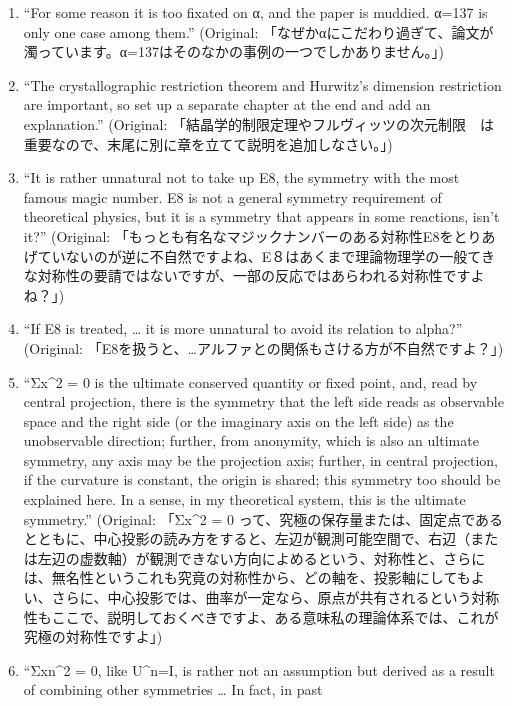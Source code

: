 \documentclass[
  a4paper,
]{article}
\providecommand{\tightlist}{%
  \setlength{\itemsep}{0pt}\setlength{\parskip}{0pt}}
\begin{document}
\begin{enumerate}
\def\labelenumi{\arabic{enumi}.}
\setcounter{enumi}{11}
\tightlist
\item
  ``For some reason it is too fixated on α, and the paper is muddied.
  α=137 is only one case among them.'' (Original:
  「なぜかαにこだわり過ぎて、論文が濁っています。α=137はそのなかの事例の一つでしかありません。」)
\item
  ``The crystallographic restriction theorem and Hurwitz's dimension
  restriction are important, so set up a separate chapter at the end and
  add an explanation.'' (Original:
  「結晶学的制限定理やフルヴィッツの次元制限　は重要なので、末尾に別に章を立てて説明を追加しなさい。」)
\item
  ``It is rather unnatural not to take up E8, the symmetry with the most
  famous magic number. E8 is not a general symmetry requirement of
  theoretical physics, but it is a symmetry that appears in some
  reactions, isn't it?'' (Original:
  「もっとも有名なマジックナンバーのある対称性E8をとりあげていないのが逆に不自然ですよね、E８はあくまで理論物理学の一般てきな対称性の要請ではないですが、一部の反応ではあらわれる対称性ですよね？」)
\item
  ``If E8 is treated, \ldots{} it is more unnatural to avoid its
  relation to alpha?'' (Original:
  「E8を扱うと、\ldots アルファとの関係もさける方が不自然ですよ？」)
\item
  ``Σx\^{}2 = 0 is the ultimate conserved quantity or fixed point, and,
  read by central projection, there is the symmetry that the left side
  reads as observable space and the right side (or the imaginary axis on
  the left side) as the unobservable direction; further, from anonymity,
  which is also an ultimate symmetry, any axis may be the projection
  axis; further, in central projection, if the curvature is constant,
  the origin is shared; this symmetry too should be explained here. In a
  sense, in my theoretical system, this is the ultimate symmetry.''
  (Original: 「Σx\^{}2 = 0
  って、究極の保存量または、固定点であるとともに、中心投影の読み方をすると、左辺が観測可能空間で、右辺（または左辺の虚数軸）が観測できない方向によめるという、対称性と、さらには、無名性というこれも究竟の対称性から、どの軸を、投影軸にしてもよい、さらに、中心投影では、曲率が一定なら、原点が共有されるという対称性もここで、説明しておくべきですよ、ある意味私の理論体系では、これが究極の対称性ですよ」)
\item
  ``Σxn\^{}2 = 0, like U\^{}n=I, is rather not an assumption but derived
  as a result of combining other symmetries \ldots{} In fact, in past

\end{enumerate}
\end{document}
